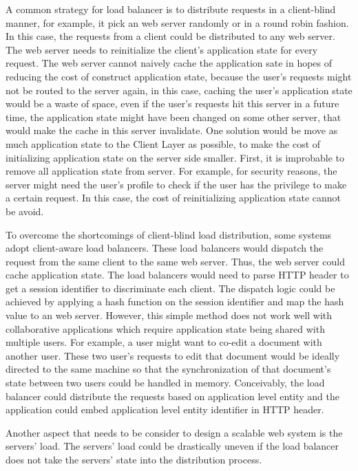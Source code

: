 A common strategy for load balancer is to distribute requests in a client-blind manner,
for example, it pick an web server randomly or in a round robin fashion.
In this case, the requests from a client could be distributed to any web server.
The web server needs to reinitialize the client's application state for every request.
The web server cannot naively cache the application sate in hopes of reducing the
cost of construct application state, 
because the user's requests might not be routed to the server again, 
in this case, caching the user's application state would be a waste of space,
even if the user's requests hit this server in a future time,
the application state might have been changed on some other server,
that would make the cache in this server invalidate.
One solution would be move as much application state to the Client Layer as possible,
to make the cost of initializing application state on the server side smaller.
First, it is improbable to remove all application state from server.
For example, for security reasons, 
the server might need the user's profile to check if the user has 
the privilege to make a certain request.
In this case, the cost of reinitializing application state cannot be avoid.

To overcome the shortcomings of client-blind load distribution,
some systems adopt client-aware load balancers.
These load balancers would dispatch the request from the same
client to the same web server.
Thus, the web server could cache application state.
The load balancers would need to parse HTTP header to get
a session identifier to discriminate each client.
The dispatch logic could be achieved by applying a hash function
on the session identifier and map the hash value to an web server.
However, 
this simple method does not work well with collaborative applications
which require application state being shared with multiple users.
For example, a user might want to co-edit a document with another user.
These two user's requests to edit that document would be ideally directed to the same machine 
so that the synchronization of that document's state between two users
could be handled in memory.
Conceivably, the load balancer could distribute the requests based on
application level entity and the application could embed application level
entity identifier in HTTP header.

Another aspect that needs to be consider to design a scalable web system
is the servers' load.
The servers' load could be drastically uneven if the load balancer
does not take the servers' state into the distribution process.

